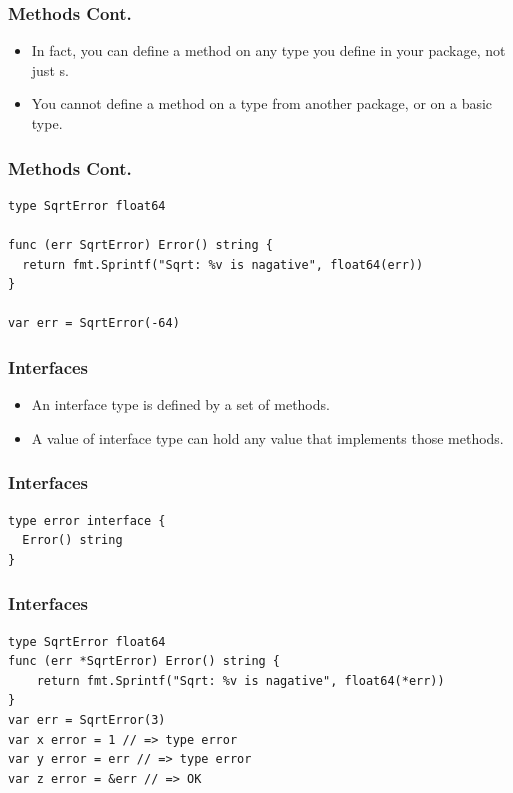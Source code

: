 \documentclass[xetex,mathserif,serif,12pt]{beamer}
\begin{document}
\begin{frame}
  \frametitle{Methods Cont.}

  \begin{itemize}
  \item In fact, you can define a method on any type you define in your package, not just s.
  \item You cannot define a method on a type from another package, or on a basic type.
  \end{itemize}
\end{frame}

\begin{frame}[fragile]
  \frametitle{Methods Cont.}

  \begin{beamer@nomargin}
    \begin{lstlisting}
type SqrtError float64

func (err SqrtError) Error() string {
  return fmt.Sprintf("Sqrt: %v is nagative", float64(err))
}

var err = SqrtError(-64)
    \end{lstlisting}
  \end{beamer@nomargin}
\end{frame}

\begin{frame}
  \frametitle{Interfaces}

  \begin{itemize}
  \item An interface type is defined by a set of methods.
  \item A value of interface type can hold any value that implements those methods.
  \end{itemize}
\end{frame}

\begin{frame}[fragile]
  \frametitle{Interfaces}

  \begin{beamer@nomargin}
    \begin{lstlisting}
type error interface {
  Error() string
}
    \end{lstlisting}
  \end{beamer@nomargin}
\end{frame}

\begin{frame}[fragile]
  \frametitle{Interfaces}

  \begin{beamer@nomargin}
    \begin{lstlisting}
type SqrtError float64
func (err *SqrtError) Error() string {
	return fmt.Sprintf("Sqrt: %v is nagative", float64(*err))
}
var err = SqrtError(3)
var x error = 1 // => type error
var y error = err // => type error
var z error = &err // => OK
    \end{lstlisting}
  \end{beamer@nomargin}
\end{frame}
\end{document}
